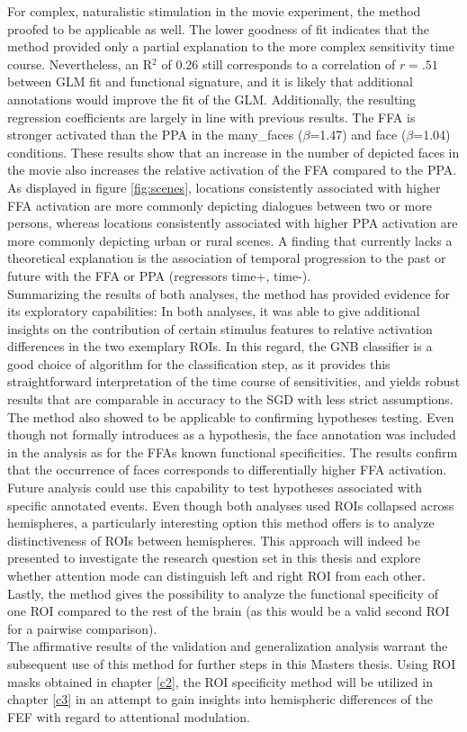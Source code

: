 \documentclass[a4paper, 12pt]{scrreprt}
\begin{document}
For complex, naturalistic stimulation in the movie experiment, the method proofed to be applicable as well. The lower goodness of fit indicates that the method provided only a partial explanation to the more complex sensitivity time course. Nevertheless, an R$^2$ of 0.26 still corresponds to a correlation of $r = .51$ between GLM fit and functional signature, and it is likely that additional annotations would improve the fit of the GLM. Additionally, the resulting regression coefficients are largely in line with previous results. The FFA is stronger activated than the PPA in the many\_faces ($\beta$=1.47) and face ($\beta$=1.04) conditions. These results show that an increase in the number of depicted faces in the movie also increases the relative activation of the FFA compared to the PPA. As displayed in figure \ref{fig:scenes}, locations consistently associated with higher FFA activation are more commonly depicting dialogues between two or more persons, whereas locations consistently associated with higher PPA activation are more commonly depicting urban or rural scenes. A finding that currently lacks a theoretical explanation is the association of temporal progression to the past or future with the FFA or PPA (regressors time+, time-).\\
Summarizing the results of both analyses, the method has provided evidence for its exploratory capabilities: In both analyses, it was able to give additional insights on the contribution of certain stimulus features to relative activation differences in the two exemplary ROIs. In this regard, the GNB classifier is a good choice of algorithm for the classification step, as it provides this straightforward interpretation of the time course of sensitivities, and yields robust results that are comparable in accuracy to the SGD with less strict assumptions. The method also showed to be applicable to confirming hypotheses testing. Even though not formally introduces as a hypothesis, the face annotation was included in the analysis as for the FFAs known functional specificities. The results confirm that the occurrence of faces corresponds to differentially higher FFA activation. Future analysis could use this capability to test hypotheses associated with specific annotated events. Even though both analyses used ROIs collapsed across hemispheres, a particularly interesting option this method offers is to analyze distinctiveness of ROIs between hemispheres. This approach will indeed be presented to investigate the research question set in this thesis and explore whether attention mode can distinguish left and right ROI from each other. Lastly, the method gives the possibility to analyze the functional specificity of one ROI compared to the rest of the brain (as this would be a valid second ROI for a pairwise comparison). \\ 
The affirmative results of the validation and generalization analysis warrant the subsequent use of this method for further steps in this Masters thesis. Using ROI masks obtained in chapter \ref{c2}, the ROI specificity method will be utilized in chapter \ref{c3} in an attempt to gain insights into hemispheric differences of the FEF with regard to attentional modulation. \\
\end{document}
